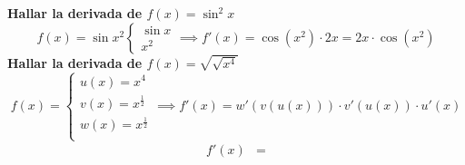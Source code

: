 \documentclass[12pt,a4paper,fleqn]{article}
\begin{document}
\vspace{1em}
\noindent\textbf{Hallar la derivada de $f(x)=\sin^2 x$}
\[
	f(x) = \sin x^2
	\begin{cases}
		\sin x \\
		x^2
	\end{cases}
	\implies f'(x)=\cos(x^2)\cdot2x=2x\cdot \cos(x^2)
\]
\textbf{Hallar la derivada de $f(x)=\sqrt{\sqrt{x^4}}$}
\[
	f(x) =
	\begin{cases}
		u(x)=x^4 \\
		v(x)=x^{\frac{1}{2}} \\
		w(x)=x^{\frac{1}{2}} \\
	\end{cases}
	\implies f'(x)=w'(v(u(x)))\cdot v'(u(x))\cdot u'(x)
\]
\begin{align*}
	f'(x) & = 
\end{align*}
\end{document}
